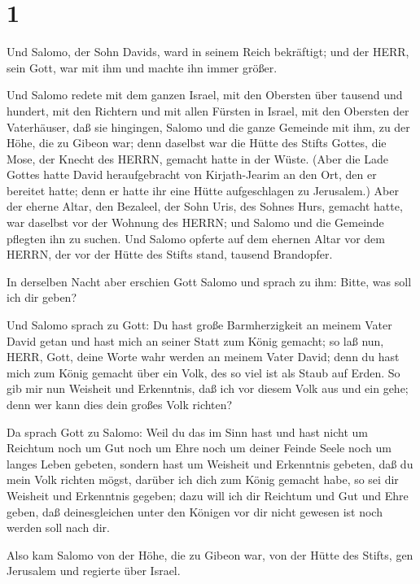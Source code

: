\hypertarget{section}{%
\section{1}\label{section}}

 Und Salomo, der Sohn Davids, ward in seinem Reich
bekräftigt; und der HERR, sein Gott, war mit ihm und machte ihn immer
größer.

 Und Salomo redete mit dem ganzen Israel, mit den Obersten
über tausend und hundert, mit den Richtern und mit allen Fürsten in
Israel, mit den Obersten der Vaterhäuser,  daß sie
hingingen, Salomo und die ganze Gemeinde mit ihm, zu der Höhe, die zu
Gibeon war; denn daselbst war die Hütte des Stifts Gottes, die Mose, der
Knecht des HERRN, gemacht hatte in der Wüste.  (Aber die
Lade Gottes hatte David heraufgebracht von Kirjath-Jearim an den Ort,
den er bereitet hatte; denn er hatte ihr eine Hütte aufgeschlagen zu
Jerusalem.)  Aber der eherne Altar, den Bezaleel, der Sohn
Uris, des Sohnes Hurs, gemacht hatte, war daselbst vor der Wohnung des
HERRN; und Salomo und die Gemeinde pflegten ihn zu suchen. 
Und Salomo opferte auf dem ehernen Altar vor dem HERRN, der vor der
Hütte des Stifts stand, tausend Brandopfer.

 In derselben Nacht aber erschien Gott Salomo und sprach zu
ihm: Bitte, was soll ich dir geben?

 Und Salomo sprach zu Gott: Du hast große Barmherzigkeit an
meinem Vater David getan und hast mich an seiner Statt zum König
gemacht;  so laß nun, HERR, Gott, deine Worte wahr werden an
meinem Vater David; denn du hast mich zum König gemacht über ein Volk,
des so viel ist als Staub auf Erden.  So gib mir nun
Weisheit und Erkenntnis, daß ich vor diesem Volk aus und ein gehe; denn
wer kann dies dein großes Volk richten?

 Da sprach Gott zu Salomo: Weil du das im Sinn hast und
hast nicht um Reichtum noch um Gut noch um Ehre noch um deiner Feinde
Seele noch um langes Leben gebeten, sondern hast um Weisheit und
Erkenntnis gebeten, daß du mein Volk richten mögst, darüber ich dich zum
König gemacht habe,  so sei dir Weisheit und Erkenntnis
gegeben; dazu will ich dir Reichtum und Gut und Ehre geben, daß
deinesgleichen unter den Königen vor dir nicht gewesen ist noch werden
soll nach dir.

 Also kam Salomo von der Höhe, die zu Gibeon war, von der
Hütte des Stifts, gen Jerusalem und regierte über Israel.

